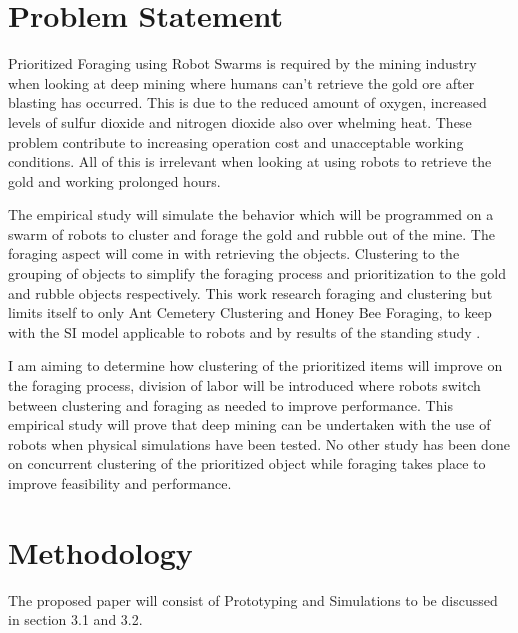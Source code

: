 \documentclass[12pt]{article}
\begin{document}
\section{Problem Statement}

\par{Prioritized Foraging using Robot Swarms is required by the mining industry when looking at deep mining where humans can't retrieve the gold ore after blasting has occurred. This is due to the reduced amount of oxygen, increased levels of sulfur dioxide and nitrogen dioxide also over whelming heat. These problem contribute to increasing operation cost and unacceptable working conditions. All of this is irrelevant when looking at using robots to retrieve the gold and working prolonged hours.} 
\\
\par{The empirical study will simulate the behavior which will be programmed on a swarm of robots to cluster and forage the gold and rubble out of the mine. The foraging aspect will come in with retrieving the objects. Clustering to the grouping of objects to simplify the foraging process and prioritization to the gold and rubble objects respectively. This work research foraging and clustering but limits itself to only Ant Cemetery Clustering and Honey Bee Foraging, to keep with the SI model applicable to robots and by results of the standing study \cite{Jade-2014}.}
\\
\par{I am aiming to determine how clustering of the prioritized items will improve on the foraging process, division of labor will be introduced where robots switch between clustering and foraging as needed to improve performance. This empirical study will prove that deep mining can be undertaken with the use of robots when physical simulations have been tested. No other study has been done on concurrent clustering of the prioritized object while foraging takes place to improve feasibility and performance.}

\section{Methodology}

\par{The proposed paper will consist of Prototyping and Simulations to be discussed in section 3.1 and 3.2.}
\end{document}
